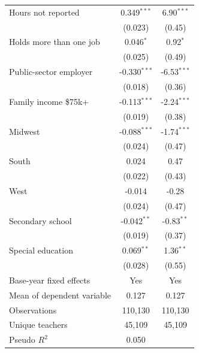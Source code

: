 \begin{tabular}{lcc}
Hours not reported & 0.349$^{***}$ & 6.90$^{***}$ \\
 & (0.023) & (0.45) \\[2pt]
Holds more than one job & 0.046$^{*}$ & 0.92$^{*}$ \\
 & (0.025) & (0.49) \\[2pt]
Public-sector employer & -0.330$^{***}$ & -6.53$^{***}$ \\
 & (0.018) & (0.36) \\[2pt]
Family income \$75k+ & -0.113$^{***}$ & -2.24$^{***}$ \\
 & (0.019) & (0.38) \\[2pt]
Midwest & -0.088$^{***}$ & -1.74$^{***}$ \\
 & (0.024) & (0.47) \\[2pt]
South & 0.024 & 0.47 \\
 & (0.022) & (0.43) \\[2pt]
West & -0.014 & -0.28 \\
 & (0.024) & (0.47) \\[2pt]
Secondary school & -0.042$^{**}$ & -0.83$^{**}$ \\
 & (0.019) & (0.37) \\[2pt]
Special education & 0.069$^{**}$ & 1.36$^{**}$ \\
 & (0.028) & (0.55) \\[2pt]
\midrule
Base-year fixed effects & Yes & Yes \\
Mean of dependent variable & 0.127 & 0.127 \\
Observations & 110,130 & 110,130 \\
Unique teachers & 45,109 & 45,109 \\
Pseudo $R^2$ & 0.050 & \\
\bottomrule
\end{tabular}
